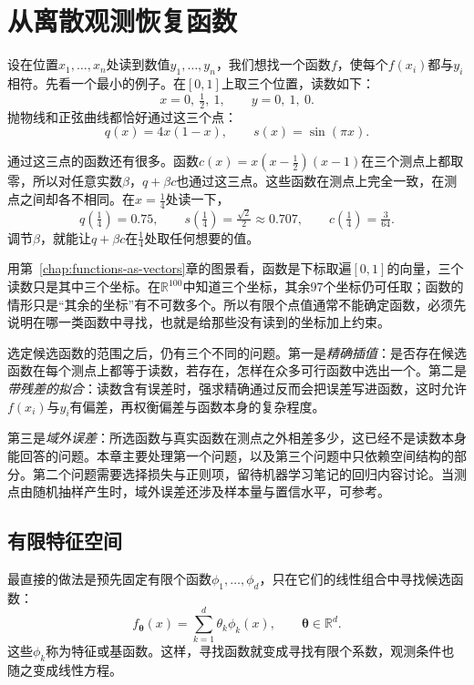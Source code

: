 \section{从离散观测恢复函数}
\label{sec:rkhs-recovery}

设在位置$x_1,\ldots,x_n$处读到数值$y_1,\ldots,y_n$，我们想找一个函数$f$，使每个$f(x_i)$都与$y_i$相符。先看一个最小的例子。在$[0,1]$上取三个位置，读数如下：
\[
 x=0,\ \tfrac12,\ 1,\qquad y=0,\ 1,\ 0.
\]
抛物线和正弦曲线都恰好通过这三个点：
\[
 q(x)=4x(1-x),\qquad s(x)=\sin(\pi x).
\]

通过这三点的函数还有很多。函数$c(x)=x(x-\tfrac12)(x-1)$在三个测点上都取零，所以对任意实数$\beta$，$q+\beta c$也通过这三点。这些函数在测点上完全一致，在测点之间却各不相同。在$x=\tfrac14$处读一下，
\[
 q(\tfrac14)=0.75,\qquad s(\tfrac14)=\tfrac{\sqrt2}{2}\approx0.707,\qquad c(\tfrac14)=\tfrac{3}{64}.
\]
调节$\beta$，就能让$q+\beta c$在$\tfrac14$处取任何想要的值。

用第~\ref{chap:functions-as-vectors}章的图景看，函数是下标取遍$[0,1]$的向量，三个读数只是其中三个坐标。在$\mathbb R^{100}$中知道三个坐标，其余$97$个坐标仍可任取；函数的情形只是“其余的坐标”有不可数多个。所以有限个点值通常不能确定函数，必须先说明在哪一类函数中寻找，也就是给那些没有读到的坐标加上约束。

选定候选函数的范围之后，仍有三个不同的问题。第一是\emph{精确插值}：是否存在候选函数在每个测点上都等于读数，若存在，怎样在众多可行函数中选出一个。第二是\emph{带残差的拟合}：读数含有误差时，强求精确通过反而会把误差写进函数，这时允许$f(x_i)$与$y_i$有偏差，再权衡偏差与函数本身的复杂程度。

第三是\emph{域外误差}：所选函数与真实函数在测点之外相差多少，这已经不是读数本身能回答的问题。本章主要处理第一个问题，以及第三个问题中只依赖空间结构的部分。第二个问题需要选择损失与正则项，留待机器学习笔记的回归内容讨论。当测点由随机抽样产生时，域外误差还涉及样本量与置信水平，可参考。

\subsection{有限特征空间}
\label{sec:rkhs-finite-feature-space}

最直接的做法是预先固定有限个函数$\phi_1,\ldots,\phi_d$，只在它们的线性组合中寻找候选函数：
\[
f_{\bm\theta}(x)=\sum_{k=1}^d\theta_k\phi_k(x),\qquad \bm\theta\in\mathbb R^d .
\]
这些$\phi_k$称为特征或基函数。这样，寻找函数就变成寻找有限个系数，观测条件也随之变成线性方程。

